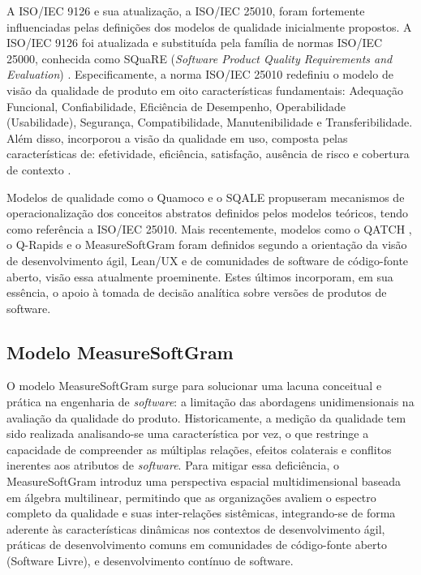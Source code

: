 A ISO/IEC 9126 e sua atualização, a ISO/IEC 25010, foram fortemente influenciadas pelas definições dos modelos de qualidade inicialmente propostos. A ISO/IEC 9126 foi atualizada e substituída pela família de normas ISO/IEC 25000, conhecida como SQuaRE (\textit{Software Product Quality Requirements and Evaluation}) \cite{curcio2016}. Especificamente, a norma ISO/IEC 25010 redefiniu o modelo de visão da qualidade de produto em oito características fundamentais: Adequação Funcional, Confiabilidade, Eficiência de Desempenho, Operabilidade (Usabilidade), Segurança, Compatibilidade, Manutenibilidade e Transferibilidade. Além disso, incorporou a visão da qualidade em uso, composta pelas características de: efetividade, eficiência, satisfação, ausência de risco e cobertura de contexto \cite{iso9126review} \cite{iso25000public}.

Modelos de qualidade como o Quamoco \cite{wagner2012quamoco} e o SQALE \cite{letouzey2010} propuseram mecanismos de operacionalização dos conceitos abstratos definidos pelos modelos teóricos, tendo como referência a ISO/IEC 25010. Mais recentemente, modelos como o QATCH \cite{siavvas2017qatch}, o Q-Rapids \cite{qrapids2019} e o MeasureSoftGram \cite{neri2020} foram definidos segundo a orientação da visão de desenvolvimento ágil, Lean/UX e de comunidades de software de código-fonte aberto, visão essa atualmente proeminente. Estes últimos incorporam, em sua essência, o apoio à tomada de decisão analítica sobre versões de produtos de software.

\subsection[Modelo MeasureSoftGram]{Modelo MeasureSoftGram}
\label{sec:msgram}

O modelo MeasureSoftGram surge para solucionar uma lacuna conceitual e prática na engenharia de \textit{software}: a limitação das abordagens unidimensionais na avaliação da qualidade do produto. Historicamente, a medição da qualidade tem sido realizada analisando-se uma característica por vez, o que restringe a capacidade de compreender as múltiplas relações, efeitos colaterais e conflitos inerentes aos atributos de \textit{software}. Para mitigar essa deficiência, o MeasureSoftGram introduz uma perspectiva espacial multidimensional baseada em álgebra multilinear, permitindo que as organizações avaliem o espectro completo da qualidade e suas inter-relações sistêmicas, integrando-se de forma aderente às características dinâmicas nos contextos de desenvolvimento ágil, práticas de desenvolvimento comuns em comunidades de código-fonte aberto  (Software Livre), e desenvolvimento contínuo de software. \cite{neri2020,neri2018}

